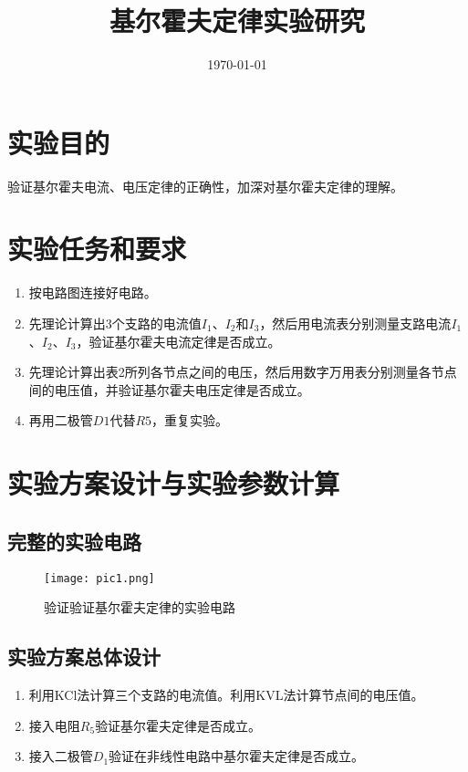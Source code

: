 \documentclass{../source/Experiment}
\title{基尔霍夫定律实验研究}
\date{\today}
\begin{document}
    \makecover
    \makeheader

    \section{实验目的}
    验证基尔霍夫电流、电压定律的正确性，加深对基尔霍夫定律的理解。
    \section{实验任务和要求}
        \begin{enumerate}
            \item 按电路图连接好电路。
            \item 先理论计算出3个支路的电流值$I_1$、$I_2$和$I_3$，然后用电流表分别测量支路电流$I_1$、$I_2$、$I_3$，验证基尔霍夫电流定律是否成立。
            \item 先理论计算出表2所列各节点之间的电压，然后用数字万用表分别测量各节点间的电压值，并验证基尔霍夫电压定律是否成立。
            \item 再用二极管$D1$代替$R5$，重复实验。 
        \end{enumerate}
    \section{实验方案设计与实验参数计算}
        \subsection{完整的实验电路}
            \begin{figure}[htbp]
                \begin{center}
                    \texttt{[image: pic1.png]}
                    \caption{验证验证基尔霍夫定律的实验电路}
                \end{center}
            \end{figure}
        \subsection{实验方案总体设计}
            \begin{enumerate}
                \item 利用KCl法计算三个支路的电流值。利用KVL法计算节点间的电压值。
                \item 接入电阻$R_5$验证基尔霍夫定律是否成立。
                \item 接入二极管$D_1$验证在非线性电路中基尔霍夫定律是否成立。
            \end{enumerate}
\end{document}
